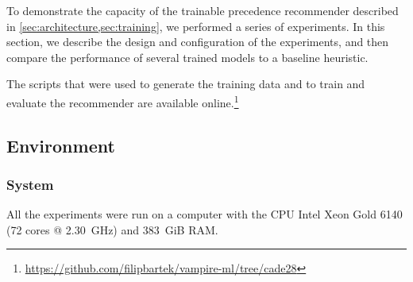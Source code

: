


To demonstrate the capacity of the trainable precedence recommender described in \cref{sec:architecture,sec:training},
we performed a series of experiments.
In this section, we describe the design and configuration of the experiments,
and then compare the performance of several trained models to a baseline heuristic.

The scripts that were used to generate the training data and to train and evaluate the recommender
are available online.\footnote{\url{https://github.com/filipbartek/vampire-ml/tree/cade28}}

\subsection{Environment}

\subsubsection{System}

All the experiments were run on a computer with
the CPU Intel Xeon Gold 6140 (72 cores @ \SI{2.30}{GHz}) and
\SI{383}{GiB} RAM.


